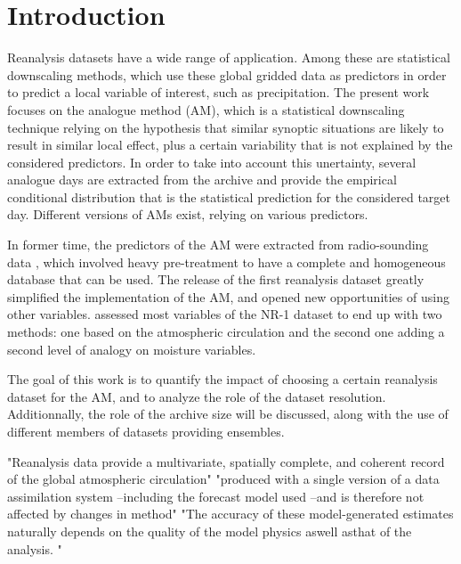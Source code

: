 \documentclass{ametsoc}
\begin{document}



\section{Introduction}

Reanalysis datasets have a wide range of application. Among these are statistical downscaling methods, which use these global gridded data as predictors in order to predict a local variable of interest, such as precipitation. The present work focuses on the analogue method (AM), which is a statistical downscaling technique relying on the hypothesis that similar synoptic situations are likely to result in similar local effect, plus a certain variability that is not explained by the considered predictors. In order to take into account this unertainty, several analogue days are extracted from the archive and provide the empirical conditional distribution that is the statistical prediction for the considered target day. Different versions of AMs exist, relying on various predictors. 

In former time, the predictors of the AM were extracted from radio-sounding data \citep{Duband1981}, which involved heavy pre-treatment to have a complete and homogeneous database that can be used. The release of the first reanalysis dataset \citep[NCEP/NCAR Reanalysis I, NR-1][]{Kalnay1996, Kistler2001} greatly simplified the implementation of the AM, and opened new opportunities of using other variables. \citet{Bontron2004} assessed most variables of the NR-1 dataset to end up with two methods: one based on the atmospheric circulation and the second one adding a second level of analogy on moisture variables.



The goal of this work is to quantify the impact of choosing a certain reanalysis dataset for the AM, and to analyze the role of the dataset resolution. Additionnally, the role of the archive size will be discussed, along with the use of different members of datasets providing ensembles.


"Reanalysis data provide a multivariate, spatially complete, and coherent record of the global atmospheric circulation" \cite{Dee2011a} "produced with a single version of a data assimilation system –including the forecast model used –and is therefore not affected by changes in method"
"The accuracy of these model-generated estimates naturally depends on the quality of the model physics aswell asthat of the analysis. "\cite{Dee2011a}
\end{document}
